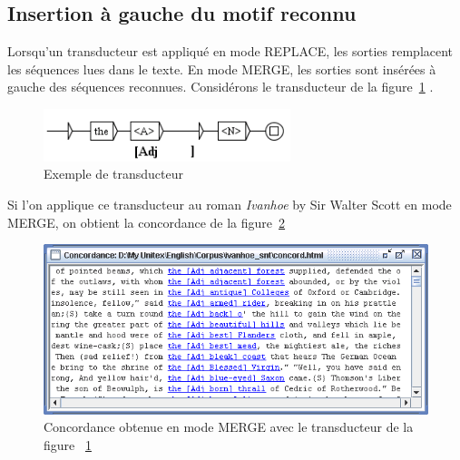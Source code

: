 \subsection{Insertion à gauche du motif reconnu}
Lorsqu’un transducteur est appliqué en mode REPLACE, les sorties remplacent les séquences lues dans le texte. 
En mode MERGE, les sorties sont insérées à gauche des séquences reconnues. Considérons le
transducteur de la figure~\ref{fig-transducer-example}
. 

\begin{figure}[!ht]
\begin{center}
\includegraphics[width=7.2cm]{resources/img/fig6-22.png}
\caption{Exemple de transducteur\label{fig-transducer-example}}
\end{center}
\end{figure}

\bigskip
\noindent 
\noindent Si l’on applique ce transducteur au roman  \textit{Ivanhoe} by Sir Walter Scott
en mode MERGE, on obtient la concordance de la figure~\ref{fig-transducer-example-concordance} 


\begin{figure}[!ht]
\begin{center}
\includegraphics[width=14.4cm]{resources/img/fig6-23.png}
\caption{Concordance obtenue en mode MERGE avec le transducteur de la figure
~\ref{fig-transducer-example}\label{fig-transducer-example-concordance}}
\end{center}
\end{figure}

